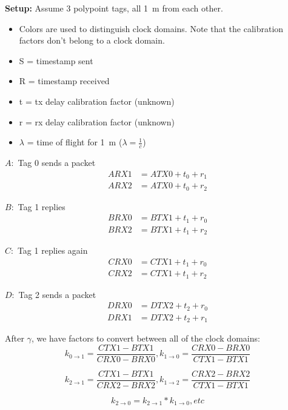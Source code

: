 \documentclass{article}
\begin{document}
\newcommand{\tda}[1]{\textcolor{red}{#1}}
\newcommand{\tdb}[1]{\textcolor{orange}{#1}}
\newcommand{\tdc}[1]{\textcolor{blue}{#1}}

\textbf{Setup:} Assume 3 polypoint tags, all 1~m from each other.

\begin{itemize}
  \item Colors are used to distinguish clock domains. Note that the
    calibration factors don't belong to a clock domain.
  \item S = timestamp sent
  \item R = timestamp received
  \item t = tx delay calibration factor (unknown)
  \item r = rx delay calibration factor (unknown)
  \item $\lambda$ = time of flight for 1~m ($\lambda = \frac{1}{c}$)
\end{itemize}

$A:$ Tag 0 sends a packet       %
\begin{align}
  ARX1 &= ATX0 + t_0 + r_1 \\
  ARX2 &= ATX0 + t_0 + r_2
\end{align}

$B:$ Tag 1 replies              %
\begin{align}
  BRX0 &= BTX1 + t_1 + r_0 \\
  BRX2 &= BTX1 + t_1 + r_2
\end{align}

$C:$ Tag 1 replies again        %
\begin{align}
  CRX0 &= CTX1 + t_1 + r_0 \\
  CRX2 &= CTX1 + t_1 + r_2
\end{align}

$D:$ Tag 2 sends a packet       %
\begin{align}
  DRX0 &= DTX2 + t_2 + r_0 \\
  DRX1 &= DTX2 + t_2 + r_1
\end{align}

After $\gamma$, we have factors to convert between all of the clock domains:
\[ k_{0\rightarrow1} = \frac{CTX1-BTX1}{CRX0-BRX0} ,%
   k_{1\rightarrow0} = \frac{CRX0-BRX0}{CTX1-BTX1} \]

\[ k_{2\rightarrow1} = \frac{CTX1-BTX1}{CRX2-BRX2} ,%
   k_{1\rightarrow2} = \frac{CRX2-BRX2}{CTX1-BTX1} \]

\[ k_{2\rightarrow0} = k_{2\rightarrow1} * k_{1\rightarrow0}, etc \]
\end{document}
